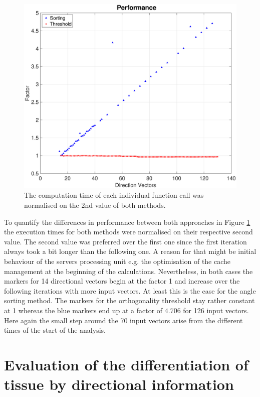 \begin{figure}[H]
    \centering
    \includegraphics[width=1.08\textwidth]{Graphics/Results/computation_normlaized_2nd_value.eps}
    \caption{The computation time of each individual function call was normalised on the 2nd value of both methods.}
    \label{fig:computation_normlaized_2nd}
\end{figure}

To quantify the differences in performance between both approaches in Figure \ref{fig:computation_normlaized_2nd} the execution times for both methods were normalised on their respective second value. The second value was preferred over the first one since the first iteration always took a bit longer than the following one. A reason for that might be initial behaviour of the servers processing unit  e.g. the optimisation of the cache management at the beginning of the calculations. Nevertheless, in both cases the markers for 14 directional vectors begin at the factor 1 and increase over the following iterations with more input vectors. At least this is the case for the angle sorting method. The markers for the orthogonality threshold stay rather constant at 1 whereas the blue markers end up at a factor of $4.706$ for 126 input vectors. Here again the small step around the 70 input vectors arise from the different times of the start of the analysis.





\section{Evaluation of the differentiation of tissue by directional information}
\label{sec:res:eval_diff_tissue_type}


